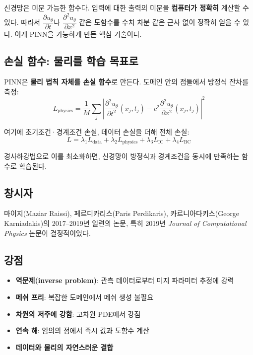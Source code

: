 \documentclass[11pt,a4paper]{article}
\begin{document}
신경망은 미분 가능한 함수다. 입력에 대한 출력의 미분을 \textbf{컴퓨터가 정확히} 계산할 수 있다. 따라서 $\dfrac{\partial u_\theta}{\partial t}$나 $\dfrac{\partial^2 u_\theta}{\partial x^2}$ 같은 도함수를 수치 차분 같은 근사 없이 정확히 얻을 수 있다. 이게 PINN을 가능하게 만든 핵심 기술이다.

\subsection{손실 함수: 물리를 학습 목표로}

PINN은 \textbf{물리 법칙 자체를 손실 함수}로 만든다. 도메인 안의 점들에서 방정식 잔차를 측정:
\[
L_{\text{physics}} = \frac{1}{M} \sum_j \left| \frac{\partial^2 u_\theta}{\partial t^2}(x_j, t_j) - c^2 \frac{\partial^2 u_\theta}{\partial x^2}(x_j, t_j) \right|^2
\]

여기에 초기조건·경계조건 손실, 데이터 손실을 더해 전체 손실:
\[
L = \lambda_1 L_{\text{data}} + \lambda_2 L_{\text{physics}} + \lambda_3 L_{\text{IC}} + \lambda_4 L_{\text{BC}}
\]

경사하강법으로 이를 최소화하면, 신경망이 방정식과 경계조건을 동시에 만족하는 함수로 학습된다.

\subsection{창시자}

마이지(Maziar Raissi), 페르디카리스(Paris Perdikaris), 카르니아다키스(George Karniadakis)의 2017--2019년 일련의 논문, 특히 2019년 \emph{Journal of Computational Physics} 논문이 결정적이었다.

\subsection{강점}

\begin{itemize}[leftmargin=*, itemsep=2pt]
  \item \textbf{역문제(inverse problem)}: 관측 데이터로부터 미지 파라미터 추정에 강력
  \item \textbf{메쉬 프리}: 복잡한 도메인에서 메쉬 생성 불필요
  \item \textbf{차원의 저주에 강함}: 고차원 PDE에서 강점
  \item \textbf{연속 해}: 임의의 점에서 즉시 값과 도함수 계산
  \item \textbf{데이터와 물리의 자연스러운 결합}
\end{itemize}
\end{document}
